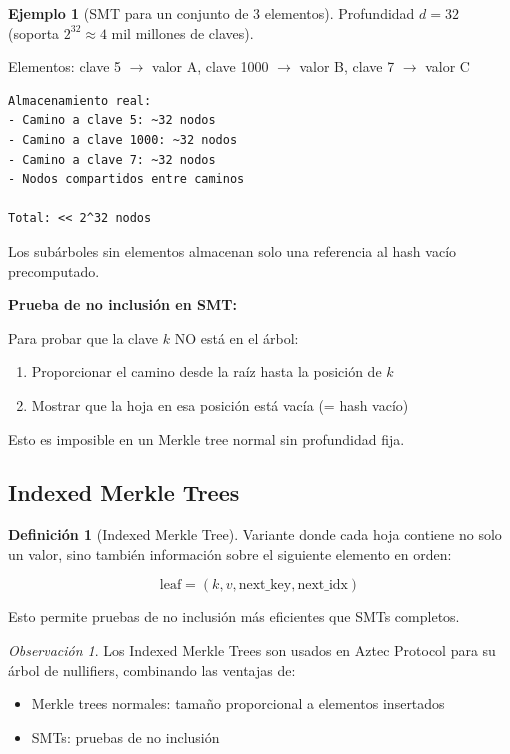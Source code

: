 \documentclass[11pt,a4paper,twoside,openright]{book}
\theoremstyle{definition}
\newtheorem{definition}{Definición}[chapter]
\newtheorem{example}{Ejemplo}[chapter]
\theoremstyle{plain}
\theoremstyle{remark}
\newtheorem{remark}{Observación}[chapter]
\begin{document}
\begin{example}[SMT para un conjunto de 3 elementos]
Profundidad $d = 32$ (soporta $2^{32} \approx 4$ mil millones de claves).

Elementos: clave 5 $\to$ valor A, clave 1000 $\to$ valor B, clave 7 $\to$ valor C

\begin{verbatim}
Almacenamiento real:
- Camino a clave 5: ~32 nodos
- Camino a clave 1000: ~32 nodos  
- Camino a clave 7: ~32 nodos
- Nodos compartidos entre caminos

Total: << 2^32 nodos
\end{verbatim}

Los subárboles sin elementos almacenan solo una referencia al hash vacío precomputado.
\end{example}

\begin{mathnote}
\textbf{Prueba de no inclusión en SMT:}

Para probar que la clave $k$ NO está en el árbol:
\begin{enumerate}
    \item Proporcionar el camino desde la raíz hasta la posición de $k$
    \item Mostrar que la hoja en esa posición está vacía (= hash vacío)
\end{enumerate}

Esto es imposible en un Merkle tree normal sin profundidad fija.
\end{mathnote}

\subsection{Indexed Merkle Trees}

\begin{definition}[Indexed Merkle Tree]
Variante donde cada hoja contiene no solo un valor, sino también información sobre el siguiente elemento en orden:

\[ \text{leaf} = (k, v, \text{next\_key}, \text{next\_idx}) \]

Esto permite pruebas de no inclusión más eficientes que SMTs completos.
\end{definition}

\begin{remark}
Los Indexed Merkle Trees son usados en Aztec Protocol para su árbol de nullifiers, combinando las ventajas de:
\begin{itemize}
    \item Merkle trees normales: tamaño proporcional a elementos insertados
    \item SMTs: pruebas de no inclusión
\end{itemize}
\end{remark}
\end{document}
